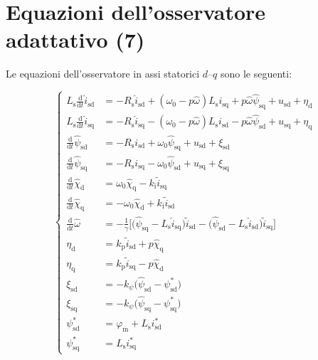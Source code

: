 \documentclass[11pt, a4paper]{scrartcl}
\begin{document}
\section*{Equazioni dell'osservatore adattativo (7)}

Le equazioni dell'osservatore in assi statorici $d$--$q$ sono le seguenti:

\begin{equation}
	\label{nlobs_1}\left\lbrace 
	\begin{aligned}
		L_\text{s} \frac{\text{d}}{\text{d}t}\hat{i}_\text{sd} &= -R_\text{s} \hat{i}_\text{sd}+\left( \omega_0-p\hat{\omega}\right)L_\text{s}i_\text{sq} + 
		p \hat{\omega}\hat{\psi}_\text{sq}+u_\text{sd}+\eta_\text{d} \\[6pt]
		L_\text{s} \frac{\text{d}}{\text{d}t}\hat{i}_\text{sq} &= -R_\text{s} \hat{i}_\text{sq}-\left( \omega_0-p\hat{\omega}\right)L_\text{s}i_\text{sd} - 
		p \hat{\omega}\hat{\psi}_\text{sd}+u_\text{sq}+\eta_\text{q} \\[6pt]
		\frac{\text{d}}{\text{d}t}\hat{\psi}_\text{sd} &= -R_\text{s} i_\text{sd} + \omega_0\hat{\psi}_\text{sq} + u_\text{sd} + \xi_\text{sd}  \\[6pt]
		\frac{\text{d}}{\text{d}t}\hat{\psi}_\text{sq} &= -R_\text{s} i_\text{sq} - \omega_0\hat{\psi}_\text{sd} + u_\text{sq} + \xi_\text{sq}  \\[6pt]
		\frac{\text{d}}{\text{d}t}\hat{\chi}_\text{d} &= \omega_0\hat{\chi}_\text{q} - k_\text{i}\tilde{i}_\text{sq}  \\[6pt]
		\frac{\text{d}}{\text{d}t}\hat{\chi}_\text{q} &= -\omega_0\hat{\chi}_\text{d} + k_\text{i}\tilde{i}_\text{sd}  \\[6pt]
		\frac{\text{d}}{\text{d}t}\hat{\omega} &= -\frac{1}{\gamma}\big[\big(\hat{\psi}_\text{sq} -L_\text{s}\hat{i}_\text{sq}\big)\tilde{i}_\text{sd} - \big(\hat{\psi}_\text{sd} -L_\text{s}\hat{i}_\text{sd}\big)\tilde{i}_\text{sq}\big]  \\[6pt]
		\eta_\text{d} &= k_\text{p}\tilde{i}_\text{sd} + p\hat{\chi}_\text{q} \\[6pt]
		\eta_\text{q} &= k_\text{p}\tilde{i}_\text{sq} - p\hat{\chi}_\text{d} \\[6pt]
		\xi_\text{sd} &= -k_{\psi}\big(\hat{\psi}_\text{sd} - \psi_\text{sd}^\text{*}\big) \\[6pt]
		\xi_\text{sq} &= -k_{\psi}\big(\hat{\psi}_\text{sq} - \psi_\text{sq}^\text{*}\big) \\[6pt]
		\psi_\text{sd}^\text{*} &= \varphi_\text{m} + L_\text{s}i_\text{sd}^\text{*} \\[6pt]
		\psi_\text{sq}^\text{*} &= L_\text{s}i_\text{sq}^\text{*}
	\end{aligned}\right. 
\end{equation}
\end{document}
